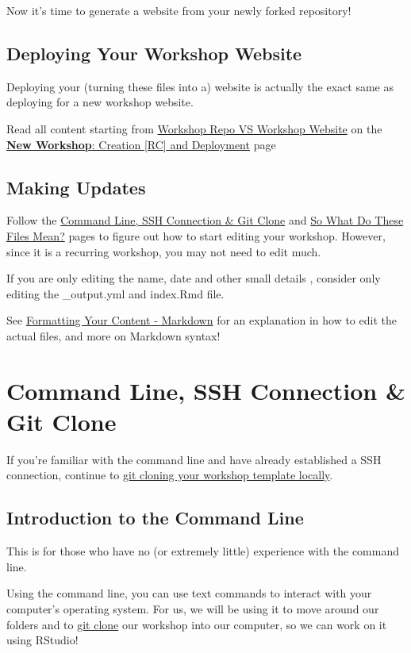 \documentclass[
]{book}
\theoremstyle{definition}
\theoremstyle{definition}
\theoremstyle{definition}
\theoremstyle{definition}
\theoremstyle{remark}
\begin{document}
Now it's time to generate a website from your newly forked repository!

\section{Deploying Your Workshop Website}\label{deploying-your-workshop-website}

Deploying your (turning these files into a) website is actually the exact same as deploying for a new workshop website.

Read all content starting from \hyperref[workshop-vs-repo]{Workshop Repo VS Workshop Website} on the \hyperref[new-workshop-create-deploy]{\textbf{New Workshop}: Creation {[}RC{]} and Deployment} page

\section{Making Updates}\label{making-updates}

Follow the \hyperref[git-instruct]{Command Line, SSH Connection \& Git Clone} and \hyperref[file-explanation]{So What Do These Files Mean?} pages to figure out how to start editing your workshop. However, since it is a recurring workshop, you may not need to edit much.

If you are only editing the name, date and other small details , consider only editing the \_output.yml and index.Rmd file.

See \hyperref[formatting]{Formatting Your Content - Markdown} for an explanation in how to edit the actual files, and more on Markdown syntax!

\chapter{Command Line, SSH Connection \& Git Clone}\label{git-instruct}

If you're familiar with the command line and have already established a SSH connection, continue to \hyperref[git-clone]{git cloning your workshop template locally}.

\section{Introduction to the Command Line}\label{introduction-to-the-command-line}

This is for those who have no (or extremely little) experience with the command line.

Using the command line, you can use text commands to interact with your computer's operating system. For us, we will be using it to move around our folders and to \hyperref[git-clone]{git clone} our workshop into our computer, so we can work on it using RStudio!
\end{document}
